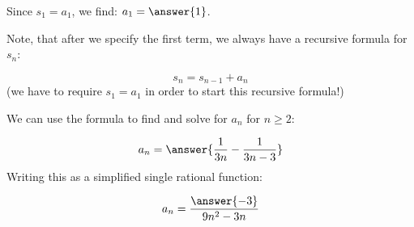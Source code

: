 \documentclass{ximera}
\begin{document}
\begin{exercise}
\begin{hint}
Since $s_1=a_1$, we find: $a_1 = \answer{1}$.

Note, that after we specify the first term, we always have a recursive formula for $s_n$:

\[
s_n = s_{n-1}+a_n
\]
(we have to require $s_1=a_1$ in order to start this recursive formula!)

We can use the formula to find  and solve for $a_n$ for $n \geq 2$:

\[
a_n = \answer{\frac{1}{3n}-\frac{1}{3n-3}}
\]
Writing this as a simplified single rational function:

\[
a_n = \frac{\answer{-3}}{9n^2-3n}
\]

\end{hint}
\end{exercise}
\end{document}
